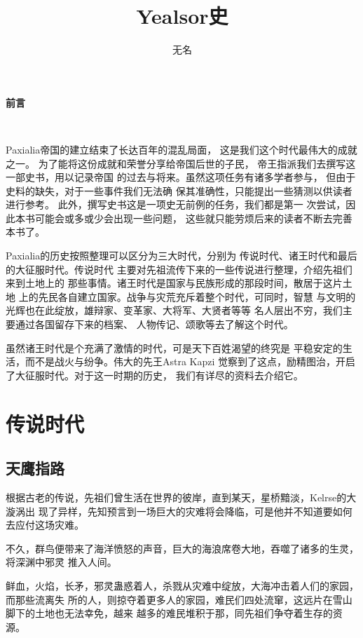 \documentclass[UTF8]{ctexbook}
\title{\textbf{Yealsor史}}
\author{无名}
\date{}
\begin{document}
\maketitle

    \setcounter{page}{1}

    \begin{center}
        \Huge\textbf{前言}
    \end{center}~\

    Paxialia帝国的建立结束了长达百年的混乱局面，
    这是我们这个时代最伟大的成就之一。
    为了能将这份成就和荣誉分享给帝国后世的子民，
    帝王指派我们去撰写这一部史书，用以记录帝国
    的过去与将来。虽然这项任务有诸多学者参与，
    但由于史料的缺失，对于一些事件我们无法确
    保其准确性，只能提出一些猜测以供读者进行参考。
    此外，撰写史书这是一项史无前例的任务，我们都是第一
    次尝试，因此本书可能会或多或少会出现一些问题，
    这些就只能劳烦后来的读者不断去完善本书了。

    Paxialia的历史按照整理可以区分为三大时代，分别为
    传说时代、诸王时代和最后的大征服时代。传说时代
    主要对先祖流传下来的一些传说进行整理，介绍先祖们来到土地上的
    那些事情。诸王时代是国家与民族形成的那段时间，散居于这片土地
    上的先民各自建立国家。战争与灾荒充斥着整个时代，可同时，智慧
    与文明的光辉也在此绽放，雄辩家、变革家、大将军、大贤者等等
    名人层出不穷，我们主要通过各国留存下来的档案、
    人物传记、颂歌等去了解这个时代。

    虽然诸王时代是个充满了激情的时代，可是天下百姓渴望的终究是
    平稳安定的生活，而不是战火与纷争。伟大的先王Astra Kapzi
    觉察到了这点，励精图治，开启了大征服时代。对于这一时期的历史，
    我们有详尽的资料去介绍它。
\tableofcontents
\part{传说时代}
    \chapter{天鹰指路}
    根据古老的传说，先祖们曾生活在世界的彼岸，直到某天，星桥黯淡，Kelrse的大漩涡出
    现了异样，先知预言到一场巨大的灾难将会降临，可是他并不知道要如何去应付这场灾难。

不久，群鸟便带来了海洋愤怒的声音，巨大的海浪席卷大地，吞噬了诸多的生灵，将深渊中邪灵
推入人间。

鲜血，火焰，长矛，邪灵蛊惑着人，杀戮从灾难中绽放，大海冲击着人们的家园，而那些流离失
所的人，则掠夺着更多人的家园，难民们四处流窜，这远片在雪山脚下的土地也无法幸免，越来
越多的难民堆积于那，同先祖们争夺着生存的资源。
\end{document}
